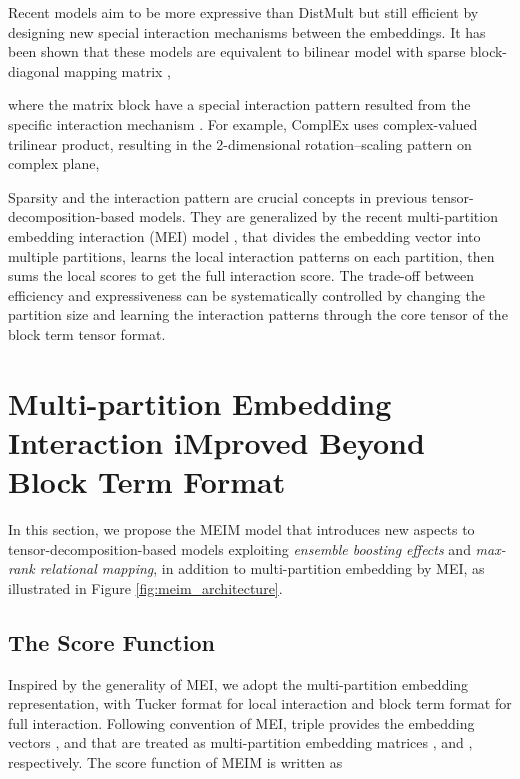\documentclass{article}
\theoremstyle{plain}
\theoremstyle{remark}
\begin{document}
Recent models aim to be more expressive than DistMult but still efficient by designing new special interaction mechanisms between the embeddings. It has been shown that these models are equivalent to bilinear model with sparse block-diagonal mapping matrix , 

where the matrix block  have a special interaction pattern resulted from the specific interaction mechanism \cite{tran_multipartitionembeddinginteraction_2020}. For example, ComplEx \cite{trouillon_complexembeddingssimple_2016} uses complex-valued trilinear product, resulting in the 2-dimensional rotation--scaling pattern on complex plane, 


Sparsity and the interaction pattern are crucial concepts in previous tensor-decomposition-based models. They are generalized by the recent multi-partition embedding interaction (MEI) model \cite{tran_multipartitionembeddinginteraction_2020}, that divides the embedding vector into multiple partitions, learns the local interaction patterns on each partition, then sums the local scores to get the full interaction score. The trade-off between efficiency and expressiveness can be systematically controlled by changing the partition size and learning the interaction patterns through the core tensor of the block term tensor format.


\section{Multi-partition Embedding Interaction iMproved Beyond Block Term Format} \label{sect:model_instance} In this section, we propose the MEIM model that introduces new aspects to tensor-decomposition-based models exploiting \textit{ensemble boosting effects} and \textit{max-rank relational mapping}, in addition to multi-partition embedding by MEI, as illustrated in Figure \ref{fig:meim_architecture}.

\subsection{The Score Function} \label{sect:model_blockterm} Inspired by the generality of MEI, we adopt the multi-partition embedding representation, with Tucker format \cite{tucker_mathematicalnotesthreemode_1966} for local interaction and block term format \cite{delathauwer_decompositionshigherordertensor_2008a} for full interaction. Following convention of MEI, triple  provides the embedding vectors , and  that are treated as multi-partition embedding matrices , and , respectively. The score function of MEIM is written as
\end{document}
